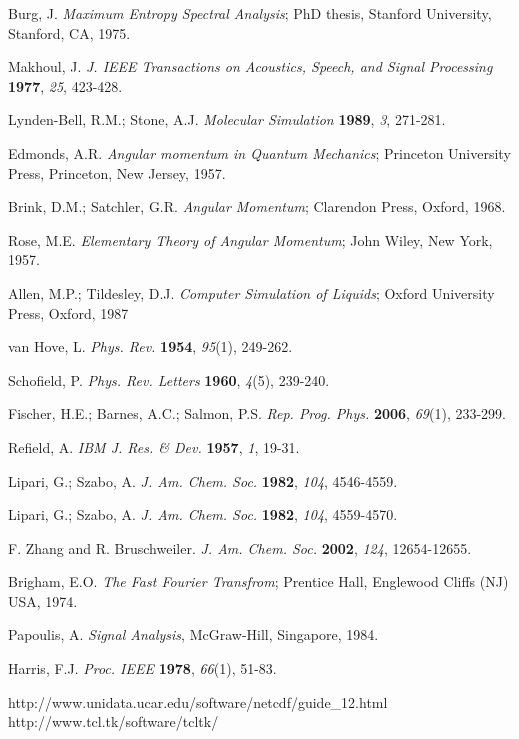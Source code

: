 \documentclass[a4paper,11pt]{report}
\begin{document}
\begin{thebibliography}{99}
 Burg, J. \textit{Maximum Entropy Spectral Analysis}; PhD thesis, Stanford University, Stanford, CA, 1975.

 Makhoul, J. \textit{J. IEEE Transactions on Acoustics, Speech, and Signal Processing} \textbf{1977}, \textit{25}, 423-428.

 Lynden-Bell, R.M.; Stone, A.J. \textit{Molecular Simulation} \textbf{1989}, \textit{3}, 271-281.

 Edmonds, A.R. \textit{Angular momentum in Quantum Mechanics}; Princeton University Press, Princeton, 
New Jersey, 1957.

 Brink, D.M.; Satchler, G.R. \textit{Angular Momentum}; Clarendon Press, Oxford, 1968.

 Rose, M.E. \textit{Elementary Theory of Angular Momentum}; John Wiley, New York, 1957.

 Allen, M.P.; Tildesley, D.J. \textit{Computer Simulation of Liquids}; Oxford University Press, Oxford, 1987

 van Hove, L. \textit{Phys.  Rev.} \textbf{1954}, \textit{95}(1), 249-262.

 Schofield, P. \textit{Phys. Rev. Letters} \textbf{1960}, \textit{4}(5), 239-240.

 Fischer, H.E.; Barnes, A.C.; Salmon, P.S. \textit{Rep. Prog. Phys.} \textbf{2006}, \textit{69}(1), 233-299.

 Refield, A. \textit{IBM J. Res. \& Dev.} \textbf{1957}, \textit{1}, 19-31.

 Lipari, G.; Szabo, A. \textit{J. Am. Chem. Soc.} \textbf{1982}, \textit{104}, 4546-4559. 

 Lipari, G.; Szabo, A. \textit{J. Am. Chem. Soc.} \textbf{1982}, \textit{104}, 4559-4570.

 F. Zhang and R. Bruschweiler. \textit{J. Am. Chem. Soc.} \textbf{2002}, \textit{124}, 12654-12655.

 Brigham, E.O. \textit{The Fast Fourier Transfrom}; Prentice Hall, Englewood Cliffs (NJ) USA, 1974.

 Papoulis, A. \textit{Signal Analysis}, McGraw-Hill, Singapore, 1984.

 Harris, F.J. \textit{Proc. IEEE} \textbf{1978}, \textit{66}(1), 51-83.

 http://www.unidata.ucar.edu/software/netcdf/guide\_12.html
 http://www.tcl.tk/software/tcltk/
\end{thebibliography}
\end{document}
